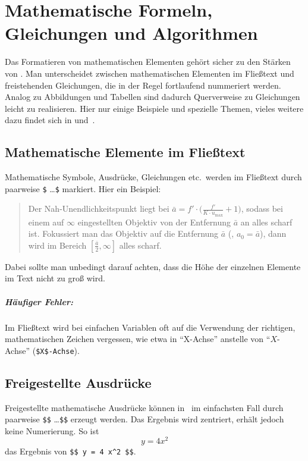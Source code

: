 \chapter[Mathem.\ Formeln etc.]{Mathematische Formeln, Gleichungen und Algorithmen}
\label{chap:Mathematik}



Das Formatieren von mathematischen Elementen gehört sicher zu den
Stär\-ken von \latex. Man unterscheidet zwischen mathematischen Elementen
im Fließtext und freistehenden Gleichungen, die in der Regel
fortlaufend nummeriert werden. Analog zu Abbildungen und Tabellen sind dadurch
Querverweise zu Gleichungen leicht zu realisieren.
Hier nur einige Beispiele und spezielle Themen, vieles weitere dazu findet sich \zB in
\cite[Kap.\ 5]{Kopka98} und~\cite{mathmode09}.


\section{Mathematische Elemente im Fließtext}

Mathematische Symbole, Ausdrücke, Gleichungen etc.\ werden im Fließtext durch paarweise \verb!$! \ldots \verb!$! markiert. Hier ein Beispiel:
%
\begin{quote}
Der Nah-Unendlichkeitspunkt liegt bei
$\bar{a} = f' \cdot \bigl( \frac{f'}{K \cdot u_{\max}} + 1 \bigr)$,
sodass bei einem auf $\infty$ eingestellten Objektiv von der Entfernung
$\bar{a}$ an alles scharf ist. Fokussiert man das
Objektiv auf die Entfernung $\bar{a}$ (\dah, $a_0 = \bar{a}$), dann wird
im Bereich $[\frac{\bar{a}}{2}, \infty]$ alles scharf.
\end{quote}
%
Dabei sollte man unbedingt darauf achten, dass die Höhe der einzelnen Elemente im Text nicht zu groß wird. 

\paragraph{Häufiger Fehler:} 
Im Fließtext wird bei einfachen Variablen oft auf die Verwendung der richtigen, mathematischen Zeichen vergessen, wie etwa in 
"`X-Achse"' anstelle von "`$X$-Achse"' (\verb!$X$-Achse!).



\section{Freigestellte Ausdrücke}

Freigestellte mathematische Ausdrücke können in \latex\ im einfachsten Fall durch paarweise \verb!$$! \ldots \verb!$$! erzeugt werden. Das Ergebnis wird zentriert, erhält jedoch keine Numerierung. So ist \zB\ $$ y = 4 x^2 $$ das Ergebnis von \verb!$$ y = 4 x^2 $$!.

